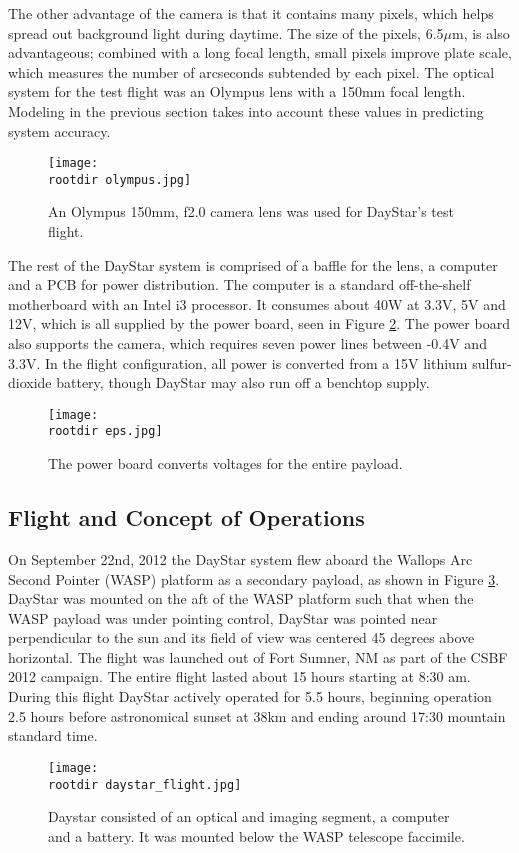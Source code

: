 \documentclass[twocolumn,letterpaper]{IEEEAerospace2012}
\newcommand{\rootdir}{./Figures/}
\begin{document}
The other advantage of the camera is that it contains many pixels, which helps spread out background light during daytime. The size of the pixels, 6.5$\mu$m, is also advantageous; combined with a long focal length, small pixels improve plate scale, which measures the number of arcseconds subtended by each pixel. The optical system for the test flight was an Olympus lens with a 150mm focal length. Modeling in the previous section takes into account these values in predicting system accuracy.
\begin{figure}[H]
    \texttt{[image: \\rootdir olympus.jpg]}
    \caption{An Olympus 150mm, f2.0 camera lens was used for DayStar's test flight. \protect\cite{olympus}}
    \label{fig:olympus}
\end{figure}
The rest of the DayStar system is comprised of a baffle for the lens, a computer and a PCB for power distribution. The computer is a standard off-the-shelf motherboard with an Intel i3 processor. It consumes about 40W at 3.3V, 5V and 12V, which is all supplied by the power board, seen in Figure \ref{fig:power}. The power board also supports the camera, which requires seven power lines between -0.4V and 3.3V. In the flight configuration, all power is converted from a 15V lithium sulfur-dioxide battery, though DayStar may also run off a benchtop supply.
\begin{figure}[H]
    \texttt{[image: \\rootdir eps.jpg]}
    \caption{The power board converts voltages for the entire payload.}
    \label{fig:power}
\end{figure}

\subsection{Flight and Concept of Operations}
On September 22nd, 2012 the DayStar system flew aboard the Wallops Arc Second Pointer (WASP) platform as a secondary payload, as shown in Figure \ref{fig:flight}. DayStar was mounted on the aft of the WASP platform such that when the WASP payload was under pointing control, DayStar was pointed near perpendicular to the sun and its field of view was centered 45 degrees above horizontal. The flight was launched out of Fort Sumner, NM as part of the CSBF 2012 campaign. The entire flight lasted about 15 hours starting at 8:30 am. During this flight DayStar actively operated for 5.5 hours, beginning operation 2.5 hours before astronomical sunset at 38km and ending around 17:30 mountain standard time.
\begin{figure}
    \centering
    \texttt{[image: \\rootdir daystar\_flight.jpg]}
    \caption{Daystar consisted of an optical and imaging segment, a computer and a battery. It was mounted below the WASP telescope faccimile.}
    \label{fig:flight}
\end{figure}
\end{document}
